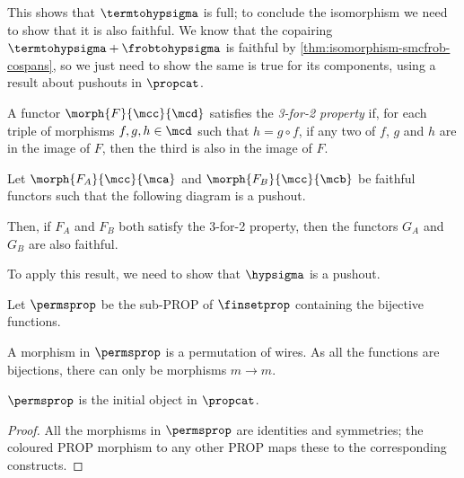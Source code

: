 This shows that \(\termtohypsigma\) is full; to conclude the isomorphism we
need to show that it is also faithful.
We know that the copairing \(\termtohypsigma + \frobtohypsigma\) is faithful
by \cref{thm:isomorphism-smcfrob-cospans}, so we just need to show the same is
true for its components, using a result about pushouts in \(\propcat\).

\begin{definition}
    A functor \(\morph{F}{\mcc}{\mcd}\) satisfies the \emph{3-for-2 property}
    if, for each triple of morphisms \(f,g,h \in \mcd\) such that
    \(h = g \circ f\), if any two of \(f\), \(g\) and \(h\) are in the image of
    \(F\), then the third is also in the image of \(F\).
\end{definition}

\begin{theorem}
    \label{thm:faithful-pushout}
    Let \(\morph{F_A}{\mcc}{\mca}\) and \(\morph{F_B}{\mcc}{\mcb}\) be faithful
    functors such that the following diagram is a pushout.
    \begin{center}
        
    \end{center}
    Then, if \(F_A\) and \(F_B\) both satisfy the 3-for-2 property, then the
    functors \(G_A\) and \(G_B\) are also faithful.
\end{theorem}

To apply this result, we need to show that \(\hypsigma\) is a pushout.

\begin{definition}
    Let \(\permsprop\) be the sub-PROP of \(\finsetprop\)
    containing the bijective functions.
\end{definition}

A morphism in \(\permsprop\) is a permutation of wires.
As all the functions are bijections, there can only be morphisms \(m \to m\).

\begin{lemma}\label{lem:perms-initial}
    \(\permsprop\) is the initial object in \(\propcat\).
\end{lemma}
\begin{proof}
    All the morphisms in \(\permsprop\) are identities and symmetries; the
    coloured PROP morphism to any other PROP maps these to the corresponding
    constructs.
\end{proof}

